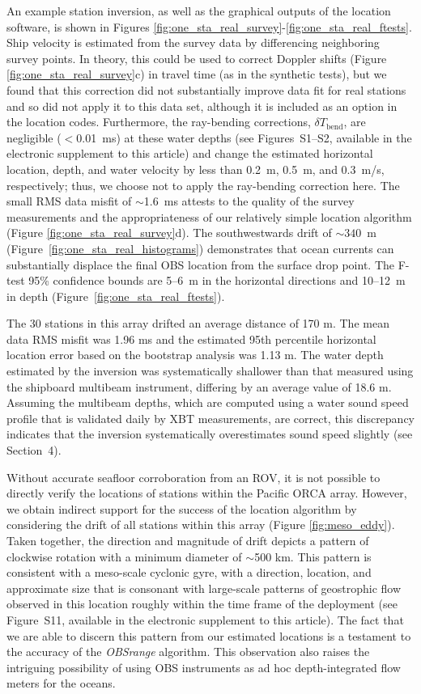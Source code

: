 An example station inversion, as well as the graphical outputs of the location software, is shown in Figures \ref{fig:one_sta_real_survey}-\ref{fig:one_sta_real_ftests}. Ship velocity is estimated from the survey data by differencing neighboring survey points. In theory, this could be used to correct Doppler shifts (Figure \ref{fig:one_sta_real_survey}c) in travel time (as in the synthetic tests), but we found that this correction did not substantially improve data fit for real stations and so did not apply it to this data set, although it is included as an option in the location codes. Furthermore, the ray-bending corrections, $\delta T_{\text{bend}}$, are negligible ($<$0.01~ms) at these water depths (see Figures~S1--S2, available in the electronic supplement to this article) and change the estimated horizontal location, depth, and water velocity by less than 0.2~m, 0.5~m, and 0.3~m/s, respectively; thus, we choose not to apply the ray-bending correction here. The small RMS data misfit of $\sim$1.6~ms attests to the quality of the survey measurements and the appropriateness of our relatively simple location algorithm (Figure \ref{fig:one_sta_real_survey}d). The southwestwards drift of \mbox{$\sim340$~m} (Figure~\ref{fig:one_sta_real_histograms}) demonstrates that ocean currents can substantially displace the final OBS location from the surface drop point. The F-test 95\% confidence bounds are 5--6~m in the horizontal directions and 10--12~m in depth (Figure~\ref{fig:one_sta_real_ftests}).

The 30 stations in this array drifted an average distance of 170 m. The mean data RMS misfit was 1.96 ms and the estimated 95th percentile horizontal location error based on the bootstrap analysis was 1.13 m. The water depth estimated by the inversion was systematically shallower than that measured using the shipboard multibeam instrument, differing by an average value of 18.6 m. Assuming the multibeam depths, which are computed using a water sound speed profile that is validated daily by XBT measurements, are correct, this discrepancy indicates that the inversion systematically overestimates sound speed slightly (see Section~4). 

Without accurate seafloor corroboration from an ROV, it is not possible to directly verify the locations of stations within the Pacific ORCA array. However, we  obtain indirect support for the success of the location algorithm by considering the drift of all stations within this array (Figure \ref{fig:meso_eddy}). Taken together, the direction and magnitude of drift depicts a pattern of clockwise rotation with a minimum diameter of $\sim$500 km. This pattern is consistent with a meso-scale cyclonic gyre, with a direction, location, and approximate size that is consonant with large-scale patterns of geostrophic flow observed in this location roughly within the time frame of the deployment (see Figure~S11, available in the electronic supplement to this article). The fact that we are able to discern this pattern from our estimated locations is a testament to the accuracy of the \textit{OBSrange} algorithm. This observation also raises the intriguing possibility of using OBS instruments as ad hoc depth-integrated flow meters for the oceans. 